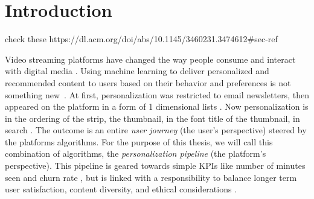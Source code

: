 
\chapter{Introduction}
\label{chapter:introduction}


check these https://dl.acm.org/doi/abs/10.1145/3460231.3474612\#sec-ref \tocite{}

Video streaming platforms have changed the way people consume and interact with digital media \tocite{}. Using machine learning to deliver personalized and recommended content to users based on their behavior and preferences is not something new~\cite{oldPersonalizationBehavior, oldPersonalizationSearch}. At first, personalization was restricted to email newsletters, then appeared on the platform in a form of 1 dimensional lists \tocite{}. Now personalization is in the ordering of the strip, the thumbnail, in the font title of the thumbnail, in search \tocite{}. The outcome is an entire \emph{user journey} (the user's perspective) steered by the platforms algorithms. For the purpose of this thesis, we will call this combination of algorithms, the \emph{personalization pipeline} (the platform's perspective). This pipeline is geared towards simple KPIs like number of minutes seen \tocite{} and churn rate \tocite{}, but is linked with a responsibility to balance longer term user satisfaction, content diversity, and ethical considerations \tocite{}.

